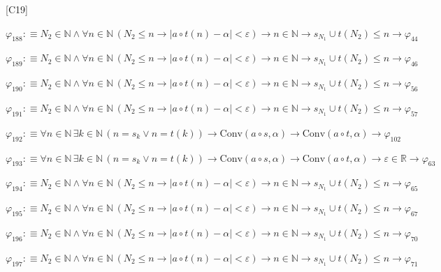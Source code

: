 \begin{fullproof}{[C19]}
\begin{abbrevlist}
\item $\varphi_{188} :\equiv N_{2} \in \mathbb{N} \land \forall n \in \mathbb{N}\,(N_{2} \leq n \to \lvert a \circ t(n) - \alpha \rvert < \varepsilon) \to n \in \mathbb{N} \to s_{N_{1}} \cup t(N_{2}) \leq n \to \varphi_{44}$
\item $\varphi_{189} :\equiv N_{2} \in \mathbb{N} \land \forall n \in \mathbb{N}\,(N_{2} \leq n \to \lvert a \circ t(n) - \alpha \rvert < \varepsilon) \to n \in \mathbb{N} \to s_{N_{1}} \cup t(N_{2}) \leq n \to \varphi_{46}$
\item $\varphi_{190} :\equiv N_{2} \in \mathbb{N} \land \forall n \in \mathbb{N}\,(N_{2} \leq n \to \lvert a \circ t(n) - \alpha \rvert < \varepsilon) \to n \in \mathbb{N} \to s_{N_{1}} \cup t(N_{2}) \leq n \to \varphi_{56}$
\item $\varphi_{191} :\equiv N_{2} \in \mathbb{N} \land \forall n \in \mathbb{N}\,(N_{2} \leq n \to \lvert a \circ t(n) - \alpha \rvert < \varepsilon) \to n \in \mathbb{N} \to s_{N_{1}} \cup t(N_{2}) \leq n \to \varphi_{57}$
\item $\varphi_{192} :\equiv \forall n \in \mathbb{N}\,\exists k \in \mathbb{N}\,(n = s_{k} \lor n = t(k)) \to \mathrm{Conv}(a \circ s,\alpha) \to \mathrm{Conv}(a \circ t,\alpha) \to \varphi_{102}$
\item $\varphi_{193} :\equiv \forall n \in \mathbb{N}\,\exists k \in \mathbb{N}\,(n = s_{k} \lor n = t(k)) \to \mathrm{Conv}(a \circ s,\alpha) \to \mathrm{Conv}(a \circ t,\alpha) \to \varepsilon \in \mathbb{R} \to \varphi_{63}$
\item $\varphi_{194} :\equiv N_{2} \in \mathbb{N} \land \forall n \in \mathbb{N}\,(N_{2} \leq n \to \lvert a \circ t(n) - \alpha \rvert < \varepsilon) \to n \in \mathbb{N} \to s_{N_{1}} \cup t(N_{2}) \leq n \to \varphi_{65}$
\item $\varphi_{195} :\equiv N_{2} \in \mathbb{N} \land \forall n \in \mathbb{N}\,(N_{2} \leq n \to \lvert a \circ t(n) - \alpha \rvert < \varepsilon) \to n \in \mathbb{N} \to s_{N_{1}} \cup t(N_{2}) \leq n \to \varphi_{67}$
\item $\varphi_{196} :\equiv N_{2} \in \mathbb{N} \land \forall n \in \mathbb{N}\,(N_{2} \leq n \to \lvert a \circ t(n) - \alpha \rvert < \varepsilon) \to n \in \mathbb{N} \to s_{N_{1}} \cup t(N_{2}) \leq n \to \varphi_{70}$
\item $\varphi_{197} :\equiv N_{2} \in \mathbb{N} \land \forall n \in \mathbb{N}\,(N_{2} \leq n \to \lvert a \circ t(n) - \alpha \rvert < \varepsilon) \to n \in \mathbb{N} \to s_{N_{1}} \cup t(N_{2}) \leq n \to \varphi_{71}$

\end{abbrevlist}
\end{fullproof}
